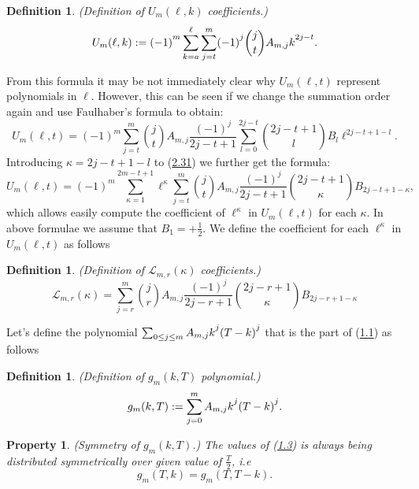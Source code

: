 \documentclass[11pt, letterpaper]{amsart} da da ya qq
\newtheorem{ppty}[thm]{Property}
\theoremstyle{definition}
\newtheorem{defn}[thm]{Definition}
\theoremstyle{remark}
\numberwithin{equation}{section}
\begin{document}
\begin{defn}
\textit{(Definition of $U_m(\ell, k)$ coefficients.)}
\begin{equation*}
U_m(\ell, k) := (-1)\strut^m \sum_{k=a}^{\ell}\sum_{j=t}^m (-1)\strut^j\binom{j}{t}A_{m,j}k\strut^{2j-t}.
\end{equation*}
\end{defn}
From this formula it may be not immediately clear why $U_m(\ell,t)$ represent polynomials in $\ell$. However, this can be seen if we change the summation order again and use Faulhaber's formula to obtain:
\begin{equation}\label{maxal1}
U_m(\ell,t) = (-1)^m \sum_{j=t}^m \binom{j}{t}A_{m,j} \frac{(-1)^j}{2j-t+1}\sum_{l=0}^{2j-t} \binom{2j-t+1}{l}B_{l}\ell^{2j-t+1-l}.
\end{equation}
Introducing $\kappa=2j-t+1-l$ to (\hyperref[maxal1]{2.31}) we further get the formula:
\begin{equation}
U_m(\ell,t) = (-1)^m \sum_{\kappa=1}^{2m-t+1} \ell^\kappa \sum_{j=t}^m \binom{j}{t}A_{m,j} \frac{(-1)^j}{2j-t+1}\binom{2j-t+1}{\kappa}B_{2j-t+1-\kappa},
\end{equation}
which allows easily compute the coefficient of $\ell^{\kappa}$ in $U_m(\ell,t)$ for each $\kappa$. In above formulae we assume that $B_1=+\frac12$. We define the coefficient for each $\ell^{\kappa}$ in $U_m(\ell,t)$ as follows
\begin{defn} \textit{(Definition of $\mathscr{L}_{m,r}(\kappa)$ coefficients.)}
\begin{equation*}
\mathscr{L}_{m,r}(\kappa)=\sum_{j=r}^{m} \binom{j}{r}A_{m,j} \frac{(-1)^j}{2j-r+1}\binom{2j-r+1}{\kappa}B_{2j-r+1-\kappa}
\end{equation*}
\end{defn}
Let's define the polynomial $\sum\nolimits_{0\leq j \leq m} A_{m,j}k\strut^j(T-k)\strut^j$ that is the part of (\hyperref[f1]{1.1}) as follows
\begin{defn} \label{symmetry_1} \textit{(Definition of $g_m(k,T)$ polynomial.)}
\begin{equation*}
g_m(k,T) := \sum_{j=0}^{m} A_{m,j}k\strut^j(T-k)\strut^j.
\end{equation*}
\end{defn}
\begin{ppty}\label{symmetry_2} (Symmetry of $g_m(k,T)$.)
The values of (\hyperref[symmetry_2]{1.3}) is always being distributed symmetrically over given value of $\tfrac{T}{2}$, i.e
\begin{equation*}
g_m(T,k)=g_m(T,T-k).
\end{equation*}
\end{ppty}
\end{document}
